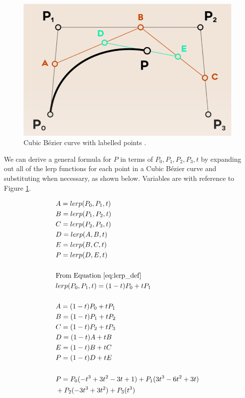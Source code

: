 \documentclass[letterpaper, 12pt]{article}
\begin{document}
\begin{figure}[H]
    \centering
    \includegraphics[width=.8\textwidth]{labelled_cubic.png}
    \caption{Cubic Bézier curve with labelled points \protect\cite{holmerBeautyBezierCurves2021}.}
    \label{fig:labelled_cubic}
\end{figure}

We can derive a general formula for \(P\) in terms of \(P_0, P_1, P_2, P_3, t\) by expanding out
all of the lerp functions for each point in a Cubic Bézier curve
and substituting when necessary, as shown below. Variables are
with reference to Figure \ref*{fig:labelled_cubic}.

\begingroup
\allowdisplaybreaks
\begin{align*}
     & A = lerp(P_0, P_1, t)
    \\
     & B = lerp(P_1, P_2, t)
    \\
     & C = lerp(P_2, P_3, t)
    \\
     & D = lerp(A, B, t)
    \\
     & E = lerp(B, C, t)
    \\
     & P = lerp(D, E, t)
    \\
    \\
     & \text{From Equation } \protect\ref*{eq:lerp_def}
    \\
     & lerp(P_0, P_1, t) = (1-t)P_0 + tP_1
    \\
    \\
     & A = (1-t)P_0 + tP_1
    \\
     & B = (1-t)P_1 + tP_2
    \\
     & C = (1-t)P_2 + tP_3
    \\
     & D = (1-t)A + tB
    \\
     & E = (1-t)B + tC
    \\
     & P = (1-t)D + tE
    \\
    \\
     & P = P_0(-t^3+3t^2-3t+1) + P_1(3t^3-6t^2+3t)
    \\
     & + P_2(-3t^3+3t^2) + P_3(t^3)
\end{align*}
\endgroup
\end{document}
